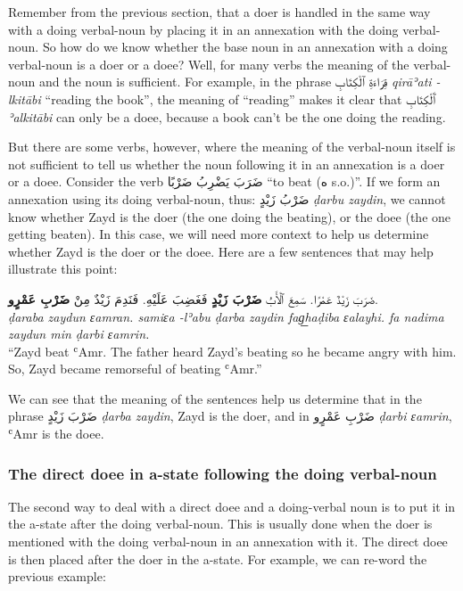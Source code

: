 \documentclass[
  10pt,
]{book}
\begin{document}
Remember from the previous section, that a doer is handled in the same way with a doing verbal-noun by placing it in an annexation with the doing verbal-noun. So how do we know whether the base noun in an annexation with a doing verbal-noun is a doer or a doee? Well, for many verbs the meaning of the verbal-noun and the noun is sufficient. For example, in the phrase \foreignlanguage{arabic}{قِرَاءَةِ ٱلْکِتَابِ} \emph{qirāʾati -lkitābi} \enquote{reading the book}, the meaning of \enquote{reading} makes it clear that \foreignlanguage{arabic}{ٱَلْکِتَابِ} \emph{ʾalkitābi} can only be a doee, because a book can't be the one doing the reading.

But there are some verbs, however, where the meaning of the verbal-noun itself is not sufficient to tell us whether the noun following it in an annexation is a doer or a doee. Consider the verb
\foreignlanguage{arabic}{ضَرَبَ يَضْرِبُ ضَرْبًا} \enquote{to beat (\foreignlanguage{arabic}{ه} s.o.)}. If we form an annexation using its doing verbal-noun, thus: \foreignlanguage{arabic}{ضَرْبُ زَيْدٍ} \emph{ḍarbu zaydin}, we cannot know whether Zayd is the doer (the one doing the beating), or the doee (the one getting beaten). In this case, we will need more context to help us determine whether Zayd is the doer or the doee. Here are a few sentences that may help illustrate this point:

\foreignlanguage{arabic}{ضَرَبَ زَيْدٌ عَمْرًا. سَمِعَ ٱلْأَبُ \textbf{ضَرْبَ زَيْدٍ} فَغَضِبَ عَلَيْهِ. فَنَدِمَ زَيْدٌ مِنْ \textbf{ضَرْبِ عَمْرٍو}.}\\
\emph{ḍaraba zaydun ɛamran. samiɛa -lʾabu ḍarba zaydin fag͟haḍiba ɛalayhi. fa nadima zaydun min ḍarbi ɛamrin.}\\
\enquote{Zayd beat ʿAmr. The father heard Zayd's beating so he became angry with him. So, Zayd became remorseful of beating ʿAmr.}

We can see that the meaning of the sentences help us determine that in the phrase
\foreignlanguage{arabic}{ضَرْبَ زَيْدٍ}
\emph{ḍarba zaydin}, Zayd is the doer, and in
\foreignlanguage{arabic}{ضَرْبِ عَمْرٍو}
\emph{ḍarbi ɛamrin}, ʿAmr is the doee.

\subsubsection{The direct doee in a-state following the doing verbal-noun}\label{the-direct-doee-in-a-state-following-the-doing-verbal-noun}

The second way to deal with a direct doee and a doing-verbal noun is to put it in the a-state after the doing verbal-noun. This is usually done when the doer is mentioned with the doing verbal-noun in an annexation with it. The direct doee is then placed after the doer in the a-state. For example, we can re-word the previous example:
\end{document}
